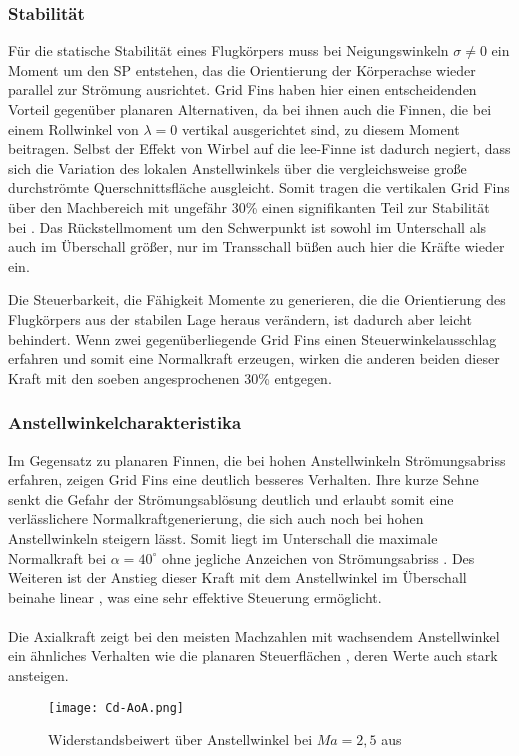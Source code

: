 \subsubsection{Stabilität}
Für die statische Stabilität eines Flugkörpers muss bei Neigungswinkeln $\sigma \neq 0$ ein Moment um den \gls{SP} entstehen, das die Orientierung der Körperachse wieder parallel zur Strömung ausrichtet. Grid Fins haben hier einen entscheidenden Vorteil gegenüber planaren Alternativen, da bei ihnen auch die Finnen, die bei einem Rollwinkel von $\lambda = 0$ vertikal ausgerichtet sind, zu diesem Moment beitragen. Selbst der Effekt von Wirbel auf die lee-Finne ist dadurch negiert, dass sich die Variation des lokalen Anstellwinkels über die vergleichsweise große durchströmte Querschnittsfläche ausgleicht. Somit tragen die vertikalen Grid Fins über den Machbereich mit ungefähr 30\% einen signifikanten Teil zur Stabilität bei \cite{vergleichPlanarNATO}. Das Rückstellmoment um den Schwerpunkt ist sowohl im Unterschall als auch im Überschall größer, nur im Transschall büßen auch hier die Kräfte wieder ein.

Die Steuerbarkeit, die Fähigkeit Momente zu generieren, die die Orientierung des Flugkörpers aus der stabilen Lage heraus verändern, ist dadurch aber leicht behindert. Wenn zwei gegenüberliegende Grid Fins einen Steuerwinkelausschlag erfahren und somit eine Normalkraft erzeugen, wirken die anderen beiden dieser Kraft mit den soeben angesprochenen 30\% entgegen.
\subsubsection{Anstellwinkelcharakteristika}
Im Gegensatz zu planaren Finnen, die bei hohen Anstellwinkeln Strömungsabriss erfahren, zeigen Grid Fins eine deutlich besseres Verhalten. Ihre kurze Sehne senkt die Gefahr der Strömungsablösung deutlich und erlaubt somit eine verlässlichere Normalkraftgenerierung, die sich auch noch bei hohen Anstellwinkeln steigern lässt. Somit liegt im Unterschall die maximale Normalkraft bei $\alpha = 40^\circ$ ohne jegliche Anzeichen von Strömungsabriss \cite{synopsis}.
Des Weiteren ist der Anstieg dieser Kraft mit dem Anstellwinkel im Überschall beinahe linear \cite{synopsis}, was eine sehr effektive Steuerung ermöglicht.\\
~\\
Die Axialkraft zeigt bei den meisten Machzahlen mit wachsendem Anstellwinkel ein ähnliches Verhalten wie die planaren Steuerflächen \cite{vergleichPlanarNATO}, deren Werte auch stark ansteigen.
\begin{figure}[h]
	\centering
	\texttt{[image: Cd-AoA.png]}
	\caption{Widerstandsbeiwert über Anstellwinkel bei $Ma=2,5$ aus \cite{vergleichPlanar}}
\end{figure}\\

